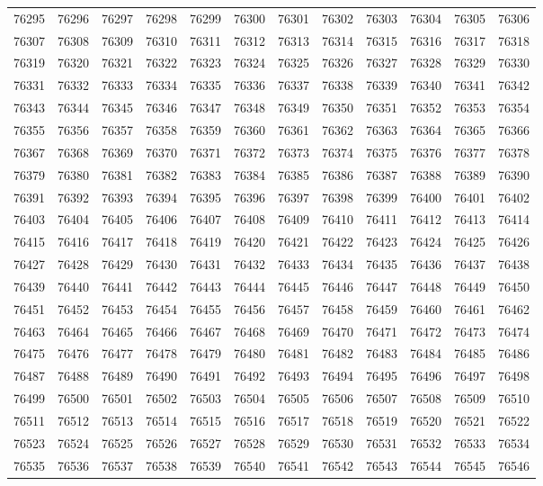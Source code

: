 \begin{center}
\begin{longtable}{llllllllllll}
76295 &76296 &76297 &76298 &76299 &76300 &76301 &76302 &76303 &76304 &76305 &76306 \\
76307 &76308 &76309 &76310 &76311 &76312 &76313 &76314 &76315 &76316 &76317 &76318 \\
76319 &76320 &76321 &76322 &76323 &76324 &76325 &76326 &76327 &76328 &76329 &76330 \\
76331 &76332 &76333 &76334 &76335 &76336 &76337 &76338 &76339 &76340 &76341 &76342 \\
76343 &76344 &76345 &76346 &76347 &76348 &76349 &76350 &76351 &76352 &76353 &76354 \\
76355 &76356 &76357 &76358 &76359 &76360 &76361 &76362 &76363 &76364 &76365 &76366 \\
76367 &76368 &76369 &76370 &76371 &76372 &76373 &76374 &76375 &76376 &76377 &76378 \\
76379 &76380 &76381 &76382 &76383 &76384 &76385 &76386 &76387 &76388 &76389 &76390 \\
76391 &76392 &76393 &76394 &76395 &76396 &76397 &76398 &76399 &76400 &76401 &76402 \\
76403 &76404 &76405 &76406 &76407 &76408 &76409 &76410 &76411 &76412 &76413 &76414 \\
76415 &76416 &76417 &76418 &76419 &76420 &76421 &76422 &76423 &76424 &76425 &76426 \\
76427 &76428 &76429 &76430 &76431 &76432 &76433 &76434 &76435 &76436 &76437 &76438 \\
76439 &76440 &76441 &76442 &76443 &76444 &76445 &76446 &76447 &76448 &76449 &76450 \\
76451 &76452 &76453 &76454 &76455 &76456 &76457 &76458 &76459 &76460 &76461 &76462 \\
76463 &76464 &76465 &76466 &76467 &76468 &76469 &76470 &76471 &76472 &76473 &76474 \\
76475 &76476 &76477 &76478 &76479 &76480 &76481 &76482 &76483 &76484 &76485 &76486 \\
76487 &76488 &76489 &76490 &76491 &76492 &76493 &76494 &76495 &76496 &76497 &76498 \\
76499 &76500 &76501 &76502 &76503 &76504 &76505 &76506 &76507 &76508 &76509 &76510 \\
76511 &76512 &76513 &76514 &76515 &76516 &76517 &76518 &76519 &76520 &76521 &76522 \\
76523 &76524 &76525 &76526 &76527 &76528 &76529 &76530 &76531 &76532 &76533 &76534 \\
76535 &76536 &76537 &76538 &76539 &76540 &76541 &76542 &76543 &76544 &76545 &76546 \\

\end{longtable}
\end{center}
